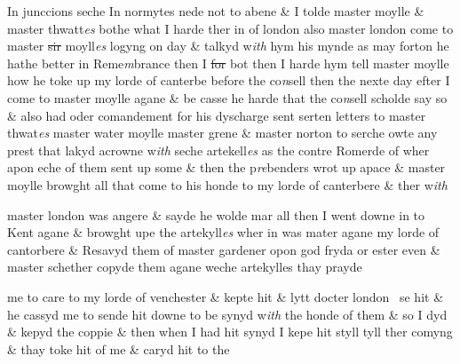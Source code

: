\documentclass[12pt, a4paper]{book}
\begin{document}
 		
				\marginpar[\vspace{0.5cm}{\textcolor{Gray}{n}}]{}
			
 		
		\ifthenelse{\isodd{\thepage}}
		{\reversemarginpar}
		{\normalmarginpar}
		In junccions seche In normytes nede not to abene \& I tolde master moylle
			\& master thwatt\textit{es} bothe what I harde ther in of london also master london
			come to master \sout{sir} moyll\textit{es} logyng on day \& talkyd w\textit{ith} hym his mynde as may
		 forton he hathe better in Reme\textit{m}brance then I \sout{for} bot then I harde hym
 			tell master moylle how he toke up my lorde of canterbe before the co\textit{n}sell
			then the nexte day efter I come to master moylle agane \& be casse he harde
		 that the co\textit{n}sell scholde say so \& also had oder comandement for his dyscharge
			sent serten letters to master thwat\textit{es} master water moylle master grene \&
			master norton to serche owte any prest that lakyd acrowne w\textit{ith} seche
		 artekell\textit{es} as the contre Romerde of wher apon eche of them sent
			up some \& then the p\textit{re}benders wrot up apace \& master moylle browght
 			all that come to his honde to my lorde of canterbere \& ther w\textit{ith}
 	
 		
				\marginpar[\vspace{0.5cm}{\textcolor{Gray}{n}}]{}
			
		
		\ifthenelse{\isodd{\thepage}}
		{\reversemarginpar}
		{\normalmarginpar}
		master london was angere \& sayde he wolde mar all then I went
		 downe in to Kent agane \& browght upe the artekyll\textit{es} wher in was
			mater agane my lorde of cantorbere \& Resavyd them
			 of master gardener
			 opon god fryda or ester even
			 \& master schether copyde them agane weche artekylles thay prayde
 	
 		
				\marginpar[\vspace{0.5cm}{\textcolor{Gray}{gardener}}]{}
			
 		
				\marginpar[\vspace{0.5cm}{\textcolor{Gray}{Shether n}}]{}
			
 		
		\ifthenelse{\isodd{\thepage}}
		{\reversemarginpar}
		{\normalmarginpar}
		
			me to care to my lorde of venchester \& kepte hit \& lytt docter london
		  se hit \& he cassyd me to sende hit downe to be synyd w\textit{ith} the honde
		 of them \& so I dyd \& kepyd the coppie \& then when I had hit synyd I kepe
		 hit styll tyll ther comyng \& thay toke hit of me \& caryd hit to the
 	
\end{document}

